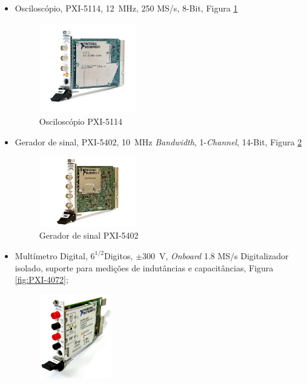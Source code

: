 \begin{itemize}
    \item Osciloscópio, PXI-5114, \SI{12}{\MHz}, 250 MS/s, 8-Bit, Figura \ref{fig:PXI-5114}
          \begin{figure}[hbtp]
              \centering
              \includegraphics[width=0.4\textwidth]{figures/PXI-5114.png}
              \caption{Osciloscópio PXI-5114 \cite{PXI-5114}}
              \label{fig:PXI-5114}
          \end{figure}
    \item Gerador de sinal, PXI-5402, \SI{10}{\MHz} \textit{Bandwidth}, 1-\textit{Channel}, 14-Bit, Figura \ref{fig:PXI-5402}
          \begin{figure}[hbtp]
              \centering
              \includegraphics[width=0.4\textwidth]{figures/PXI-5402.png}
              \caption{Gerador de sinal PXI-5402 \cite{PXI-5402}}
              \label{fig:PXI-5402}
          \end{figure}
    \item Multímetro Digital, \(6^{1/2} \)Digitos, \(\pm\)\SI{300}{\volt}, \textit{Onboard} 1.8 MS/s Digitalizador isolado, suporte para medições de indutâncias e capacitâncias, Figura \ref{fig:PXI-4072};
          \begin{figure}[hbtp]
              \centering
              \includegraphics[width=0.3\textwidth]{figures/PXI-4072.png}

\end{figure}
\end{itemize}
